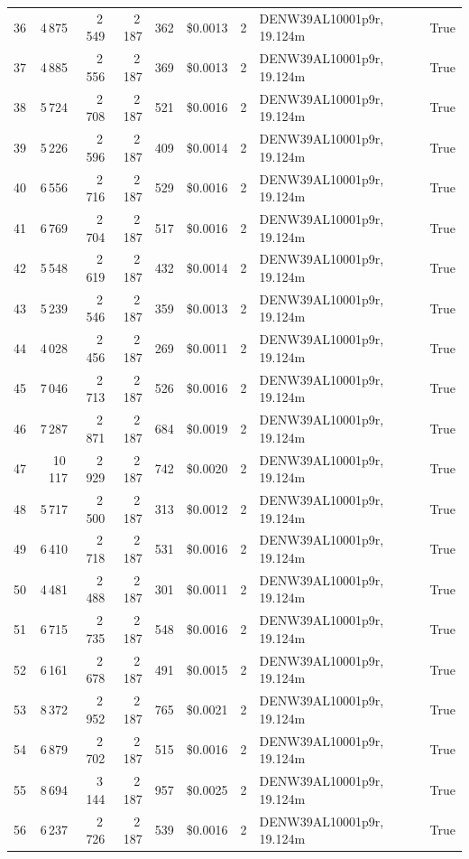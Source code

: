 \documentclass[a4paper,11pt]{article}
\begin{document}
\begin{table}[ht]
\begin{tabular}{r r r r r r r p{3cm} l}
36 & 4\,875 & 2\,549 & 2\,187 & 362 & \$0.0013 & 2 & DENW39AL10001p9r, 19.124m & True \\
37 & 4\,885 & 2\,556 & 2\,187 & 369 & \$0.0013 & 2 & DENW39AL10001p9r, 19.124m & True \\
38 & 5\,724 & 2\,708 & 2\,187 & 521 & \$0.0016 & 2 & DENW39AL10001p9r, 19.124m & True \\
39 & 5\,226 & 2\,596 & 2\,187 & 409 & \$0.0014 & 2 & DENW39AL10001p9r, 19.124m & True \\
40 & 6\,556 & 2\,716 & 2\,187 & 529 & \$0.0016 & 2 & DENW39AL10001p9r, 19.124m & True \\
41 & 6\,769 & 2\,704 & 2\,187 & 517 & \$0.0016 & 2 & DENW39AL10001p9r, 19.124m & True \\
42 & 5\,548 & 2\,619 & 2\,187 & 432 & \$0.0014 & 2 & DENW39AL10001p9r, 19.124m & True \\
43 & 5\,239 & 2\,546 & 2\,187 & 359 & \$0.0013 & 2 & DENW39AL10001p9r, 19.124m & True \\
44 & 4\,028 & 2\,456 & 2\,187 & 269 & \$0.0011 & 2 & DENW39AL10001p9r, 19.124m & True \\
45 & 7\,046 & 2\,713 & 2\,187 & 526 & \$0.0016 & 2 & DENW39AL10001p9r, 19.124m & True \\
46 & 7\,287 & 2\,871 & 2\,187 & 684 & \$0.0019 & 2 & DENW39AL10001p9r, 19.124m & True \\
47 & 10\,117 & 2\,929 & 2\,187 & 742 & \$0.0020 & 2 & DENW39AL10001p9r, 19.124m & True \\
48 & 5\,717 & 2\,500 & 2\,187 & 313 & \$0.0012 & 2 & DENW39AL10001p9r, 19.124m & True \\
49 & 6\,410 & 2\,718 & 2\,187 & 531 & \$0.0016 & 2 & DENW39AL10001p9r, 19.124m & True \\
50 & 4\,481 & 2\,488 & 2\,187 & 301 & \$0.0011 & 2 & DENW39AL10001p9r, 19.124m & True \\
51 & 6\,715 & 2\,735 & 2\,187 & 548 & \$0.0016 & 2 & DENW39AL10001p9r, 19.124m & True \\
52 & 6\,161 & 2\,678 & 2\,187 & 491 & \$0.0015 & 2 & DENW39AL10001p9r, 19.124m & True \\
53 & 8\,372 & 2\,952 & 2\,187 & 765 & \$0.0021 & 2 & DENW39AL10001p9r, 19.124m & True \\
54 & 6\,879 & 2\,702 & 2\,187 & 515 & \$0.0016 & 2 & DENW39AL10001p9r, 19.124m & True \\
55 & 8\,694 & 3\,144 & 2\,187 & 957 & \$0.0025 & 2 & DENW39AL10001p9r, 19.124m & True \\
56 & 6\,237 & 2\,726 & 2\,187 & 539 & \$0.0016 & 2 & DENW39AL10001p9r, 19.124m & True \\

\end{tabular}
\end{table}
\end{document}

